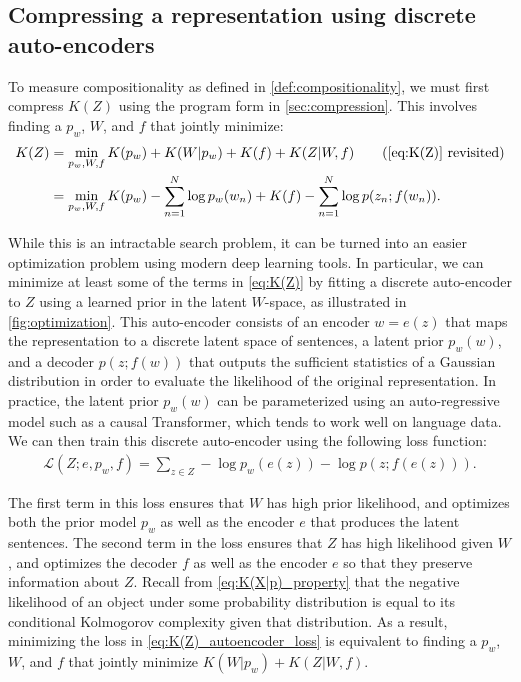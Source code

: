 \documentclass{article}
\begin{document}
\begin{appendices}
\section{Compressing a representation using discrete auto-encoders}
\label{sec:optimization}

To measure compositionality as defined in \cref{def:compositionality}, we must first compress $K(Z)$ using the program form in \cref{sec:compression}. This involves finding a $p_w$, $W$, and $f$ that jointly minimize:
\begin{align}
    K(Z) &= \min_{p_w,W,f} K(p_w) + K(W|p_w) + K(f) + K(Z|W,f) \tag{\ref{eq:K(Z)} revisited} \\
         &= \min_{p_w,W,f} K(p_w) - \sum_{n=1}^N \log p_w(w_n) + K(f) - \sum_{n=1}^N \log p(z_n;f(w_n)) . \notag
\end{align}

While this is an intractable search problem, it can be turned into an easier optimization problem using modern deep learning tools. In particular, we can minimize at least some of the terms in \cref{eq:K(Z)} by fitting a discrete auto-encoder to $Z$ using a learned prior in the latent $W$-space, as illustrated in \cref{fig:optimization}. This auto-encoder consists of an encoder $w = e(z)$ that maps the representation to a discrete latent space of sentences, a latent prior $p_w(w)$, and a decoder $p(z ; f(w))$ that outputs the sufficient statistics of a Gaussian distribution in order to evaluate the likelihood of the original representation. In practice, the latent prior $p_w(w)$ can be parameterized using an auto-regressive model such as a causal Transformer, which tends to work well on language data. We can then train this discrete auto-encoder using the following loss function:
\begin{align}
    \label{eq:K(Z)_autoencoder_loss}
    \mathcal{L}(Z ; e, p_w, f) = \sum_{z \in Z} -\log p_w(e(z)) -\log p(z ; f(e(z))) .
\end{align}

The first term in this loss ensures that $W$ has high prior likelihood, and optimizes both the prior model $p_w$ as well as the encoder $e$ that produces the latent sentences. The second term in the loss ensures that $Z$ has high likelihood given $W$, and optimizes the decoder $f$ as well as the encoder $e$ so that they preserve information about $Z$. Recall from \cref{eq:K(X|p)_property} that the negative likelihood of an object under some probability distribution is equal to its conditional Kolmogorov complexity given that distribution. As a result, minimizing the loss in \cref{eq:K(Z)_autoencoder_loss} is equivalent to finding a $p_w$, $W$, and $f$ that jointly minimize $K(W|p_w) + K(Z|W,f)$.


\end{appendices}
\end{document}
